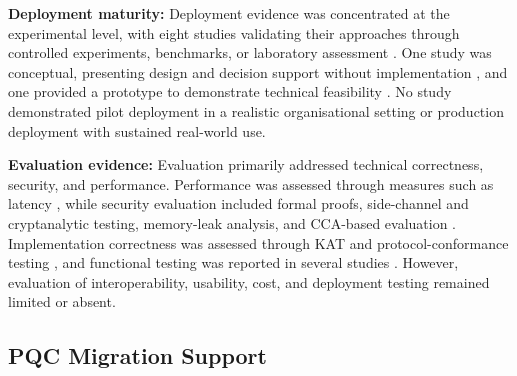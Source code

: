 \documentclass[letterpaper,twocolumn,10pt]{article}
\begin{document}
\textbf{Deployment maturity:} Deployment evidence was concentrated at the experimental level, with eight studies validating their approaches through controlled experiments, benchmarks, or laboratory assessment \cite{Ana_huelsing2021wireguard, Ana_ojha2025adoption, Ana_tsili_scalable_2025, Ana_kannwischer_improving_2022, Ana_e27020212, Ana_esser_sok_2024, Ana_hekkala_implementing_2023, Ana_PQCLeo25}. One study was conceptual, presenting design and decision support without implementation \cite{Ana_decisionAlgo}, and one provided a prototype to demonstrate technical feasibility \cite{Ana_saucedo-estrada_post-quantum_2020}. No study demonstrated pilot deployment in a realistic organisational setting or production deployment with sustained real-world use.

\textbf{Evaluation evidence:} Evaluation primarily addressed technical correctness, security, and performance. Performance was assessed through measures such as latency \cite{Ana_decisionAlgo, Ana_huelsing2021wireguard, Ana_tsili_scalable_2025, Ana_e27020212, Ana_hekkala_implementing_2023, Ana_PQCLeo25}, while security evaluation included formal proofs, side-channel and cryptanalytic testing, memory-leak analysis, and CCA-based evaluation \cite{Ana_huelsing2021wireguard, Ana_ojha2025adoption, Ana_hekkala_implementing_2023, Ana_saucedo-estrada_post-quantum_2020}. Implementation correctness was assessed through KAT and protocol-conformance testing \cite{Ana_hekkala_implementing_2023, Ana_e27020212}, and functional testing was reported in several studies \cite{Ana_kannwischer_improving_2022, Ana_esser_sok_2024, Ana_PQCLeo25}. However, evaluation of interoperability, usability, cost, and deployment testing remained limited or absent.

\subsection{PQC Migration Support}
\label{ResMigAp}
\end{document}
